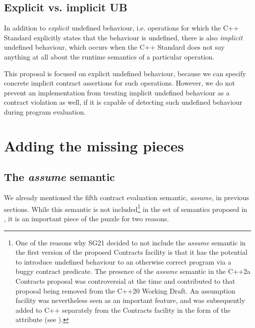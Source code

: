 \subsection{Explicit vs. implicit UB}

In addition to \emph{explicit} undefined behaviour, i.e. operations for which the C++ Standard explicitly states that the behaviour is undefined, there is also \emph{implicit} undefined behaviour, which occurs when the C++ Standard does not say anything at all about the runtime semantics of a particular operation.

This proposal is focused on explicit undefined behaviour, because we can specify concrete implicit contract assertions for such operations. However, we do not prevent an implementation from treating implicit undefined behaviour as a contract violation as well, if it is capable of detecting such undefined behaviour during program evaluation.

\section{Adding the missing pieces}

\subsection{The \emph{assume} semantic}
\label{assume}

We already mentioned the fifth contract evaluation semantic, \emph{assume}, in previous sections. While this semantic is not included\footnote{One of the reasons why SG21 decided to not include the \emph{assume} semantic in the first version of the proposed Contracts facility is that it has the potential to introduce undefined behaviour to an otherwise correct program via a buggy contract predicate. The presence of the \emph{assume} semantic in the C++2a Contracts proposal \cite{P0542R5} was controversial at the time and contributed to that proposal being removed from the C++20 Working Draft. An assumption facility was nevertheless seen as an important feature, and was subsequently added to C++ separately from the Contracts facility in the form of the \tcode{[[assume]]} attribute (see \cite{P1774R8}).}  in the set of semantics proposed in \cite{P2900R9}, it is an important piece of the puzzle for two reasons.

